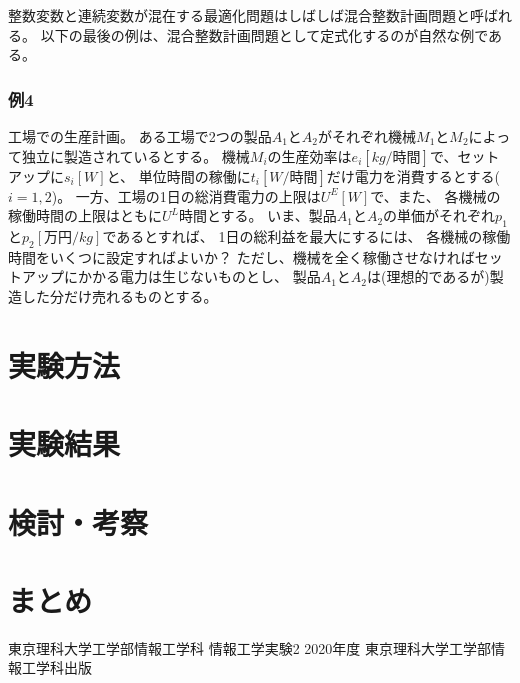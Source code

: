 \documentclass[12pt]{jarticle}
\begin{document}
整数変数と連続変数が混在する最適化問題はしばしば混合整数計画問題と呼ばれる。
以下の最後の例は、混合整数計画問題として定式化するのが自然な例である。

\subsubsection*{例4}
工場での生産計画。
ある工場で2つの製品$A_1$と$A_2$がそれぞれ機械$M_1$と$M_2$によって独立に製造されているとする。
機械$M_i$の生産効率は$e_i[kg/時間]$で、セットアップに$s_i[W]$と、
単位時間の稼働に$t_i[W/時間]$だけ電力を消費するとする($i=1,2$)。
一方、工場の1日の総消費電力の上限は$U^E[W]$で、また、
各機械の稼働時間の上限はともに$U^L$時間とする。
いま、製品$A_1$と$A_2$の単価がそれぞれ$p_1$と$p_2[万円/kg]$であるとすれば、
1日の総利益を最大にするには、
各機械の稼働時間をいくつに設定すればよいか？
ただし、機械を全く稼働させなければセットアップにかかる電力は生じないものとし、
製品$A_1$と$A_2$は(理想的であるが)製造した分だけ売れるものとする。


\section{実験方法}

\section{実験結果}

\section{検討・考察}

\section{まとめ}


\clearpage

\begin{thebibliography}{99}
    \label{sannkoubunnkenn_chapter}
    東京理科大学工学部情報工学科 情報工学実験2 2020年度
    東京理科大学工学部情報工学科出版

\end{thebibliography}


\clearpage

\appendix
\end{document}
